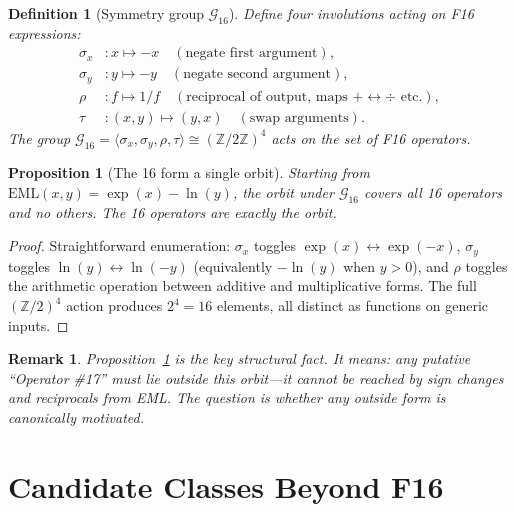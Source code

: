 \documentclass[11pt]{article}
\newtheorem{proposition}[theorem]{Proposition}
\newtheorem{definition}[theorem]{Definition}
\newtheorem{remark}[theorem]{Remark}
\begin{document}
\begin{definition}[Symmetry group $\mathcal{G}_{16}$]
Define four involutions acting on F16 expressions:
\begin{align*}
  \sigma_x &: x \mapsto -x \quad (\text{negate first argument}),\\
  \sigma_y &: y \mapsto -y \quad (\text{negate second argument}),\\
  \rho     &: f \mapsto 1/f \quad (\text{reciprocal of output, maps $+\leftrightarrow\div$ etc.}),\\
  \tau     &: (x,y) \mapsto (y,x) \quad (\text{swap arguments}).
\end{align*}
The group $\mathcal{G}_{16} = \langle \sigma_x, \sigma_y, \rho, \tau \rangle \cong (\mathbb{Z}/2\mathbb{Z})^4$
acts on the set of F16 operators.
\end{definition}

\begin{proposition}[The 16 form a single orbit]
\label{prop:orbit}
Starting from $\mathrm{EML}(x,y) = \exp(x) - \ln(y)$, the orbit under
$\mathcal{G}_{16}$ covers all 16 operators and no others.
The 16 operators are exactly the orbit.
\end{proposition}

\begin{proof}
Straightforward enumeration: $\sigma_x$ toggles $\exp(x) \leftrightarrow \exp(-x)$,
$\sigma_y$ toggles $\ln(y) \leftrightarrow \ln(-y)$ (equivalently $-\ln(y)$ when $y>0$),
and $\rho$ toggles the arithmetic operation between additive and multiplicative forms.
The full $(\mathbb{Z}/2)^4$ action produces $2^4 = 16$ elements, all distinct
as functions on generic inputs.
\end{proof}

\begin{remark}
Proposition~\ref{prop:orbit} is the key structural fact. It means:
any putative ``Operator \#17'' must \emph{lie outside this orbit}---it cannot be
reached by sign changes and reciprocals from EML.  The question is whether
any outside form is \emph{canonically motivated}.
\end{remark}

\section{Candidate Classes Beyond F16}
\label{sec:candidates}
\end{document}
